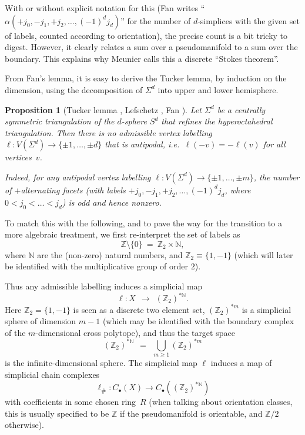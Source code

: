 \documentclass[11pt,a4paper,draft]{article}
\newcommand{\Z}{{\mathbb Z}}
\newcommand{\N}{{\mathbb N}}
\newtheorem{proposition}[theorem]{Proposition}
\theoremstyle{definition}
\begin{document}
With or without explicit notation for this (Fan writes
``$\alpha(+j_0,-j_1,+j_2,\dots,(-1)^dj_d)$'' for the number of $d$-simplices
with the given set of labels, counted according to orientation), the precise
count is a bit tricky to digest.  However, it clearly
relates a sum over a pseudomanifold to a sum over the boundary.
This explains why Meunier \cite{meunier06:_spern} calls this a discrete
``Stokes theorem''.

From Fan's lemma, it is easy to derive the Tucker lemma, by induction
on the dimension, using the decomposition of $\Sigma^d$
into upper and lower hemisphere.

\begin{proposition}[Tucker lemma \cite{Tucker}, Lefschetz
{\cite[Sect.~IV\S7]{Lefschetz-intro}}, 
Fan \cite{fan52}]\label{tucker_lemma}
\label{prop:tucker_lemma}
    Let $\Sigma^d$ be a centrally symmetric triangulation of the
    $d$-sphere $S^d$ that refines the hyperoctahedral triangulation. Then
    there is no admissible vertex labelling $\ell: V(\Sigma^d) \rightarrow
    \{\pm 1,\dots,\pm d\}$ that is antipodal, i.e.\ $\ell(-v)=-\ell(v)$
    for all vertices~$v$.

    Indeed, for any antipodal vertex labelling $\ell: V(\Sigma^d)
    \rightarrow \{\pm 1,\dots,\pm m\}$, the number of $+$alter\-nating
    facets (with labels $+j_0,-j_1,+j_2,\dots,(-1)^dj_d$, where $0<j_0<\dots<j_d$)
    is odd and hence nonzero.
\end{proposition}

To match this with the following, and to pave the way for the
transition to a more algebraic treatment, we first re-interpret the
set of labels as
\[
   \Z\setminus\{0\}\ =\ \Z_2\times \N,
\]
where $\N$ are the (non-zero) natural numbers, and
$\Z_2\equiv\{1,-1\}$ (which will later be identified with the multiplicative group of order $2$).

Thus any admissible labelling induces a simplicial map
\[
    \ell: X \ \ \longrightarrow\ \ (\Z_2)^{*\N}.
\]
Here $\Z_2=\{1,-1\}$ is seen as a discrete two element set,
$(\Z_2)^{*m}$ is a simplicial sphere of
dimension $m-1$ (which may be identified with the boundary complex of the
$m$-dimensional cross polytope), and thus the target space
\[
    (\Z_2)^{*\N}\ \ =\ \ \bigcup_{m \ge 1}(\Z_2)^{*m}
\]
is the infinite-dimensional sphere.
The simplicial map $\ell$ induces a map of simplicial chain complexes
\[
   \ell_\#: C_\bullet(X) \rightarrow C_\bullet((\Z_2)^{*\N})
\]
with coefficients in some chosen ring~$R$ (when talking about
orientation classes, this is usually specified to be $\Z$ if the pseudomanifold is orientable, and
$\Z/2$ otherwise).
\end{document}
